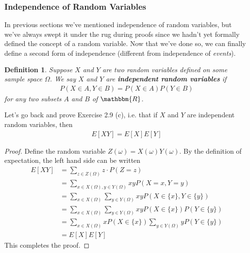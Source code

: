 \documentclass[11pt,letterpaper]{article}
\newcommand\real{\mathbbm{R}}
\numberwithin{theorem}{section}
\newtheorem{definition}[theorem]{Definition}
\numberwithin{definition}{section}
\numberwithin{lemma}{section}
\numberwithin{corollary}{section}
\numberwithin{proposition}{section}
\theoremstyle{definition}
\numberwithin{remark}{section}
\numberwithin{claim}{section}
\numberwithin{observation}{section}
\numberwithin{fact}{section}
\numberwithin{assumption}{section}
\numberwithin{example}{section}
\numberwithin{exercise}{section}
\begin{document}

\subsubsection{Independence of Random Variables}
In previous sections we've mentioned independence of random variables, but we've always swept it under the rug during proofs since we hadn't yet formally defined the concept of a random variable. Now that we've done so, we can finally define a second form of independence (different from independence of \textit{events}).
\begin{definition}
Suppose $X$ and $Y$ are two random variables defined on some sample space $\Omega$. We say $X$ and $Y$ are \textbf{independent random variables} if 
\begin{align*}
P(X \in A, Y \in B) = P(X \in A) P(Y \in B)
\end{align*}
for any two subsets $A$ and $B$ of $\real$.
\end{definition}
Let's go back and prove Exercise 2.9 (c), i.e. that if $X$ and $Y$ are independent random variables, then
\begin{align*}
E[XY] = E[X]E[Y]
\end{align*}
\begin{proof}
Define the random variable $Z(\omega) = X(\omega) Y(\omega)$. By the definition of expectation, the left hand side can be written
\begin{align*}
E[XY] &= \sum_{z \in Z(\Omega)} z \cdot P(Z = z) \\
&= \sum_{x \in X(\Omega), y \in Y(\Omega)} xy P(X = x, Y = y) \\
&= \sum_{x \in X(\Omega)} \sum_{y \in Y(\Omega)} xy P(X \in \{x\}, Y \in \{y\}) \\
&= \sum_{x \in X(\Omega)} \sum_{y \in Y(\Omega)} xy P(X \in \{x\})P(Y \in \{y\}) \\
&= \sum_{x \in X(\Omega)} x P(X \in \{x\}) \sum_{y \in Y(\Omega)} yP(Y \in \{y\}) \\
&= E[X]E[Y]
\end{align*}
This completes the proof.
\end{proof}
\end{document}
